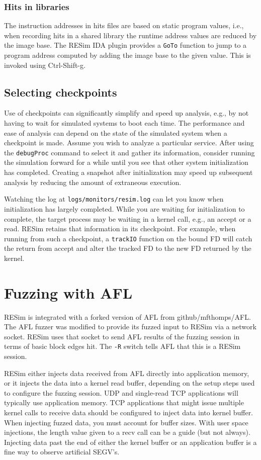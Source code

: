 \documentclass[titlepage]{article}
\begin{document}
\subsubsection{Hits in libraries}
The instruction addresses in hits files are based on static program values, i.e., when recording hits in a shared library the runtime address values are reduced by the image base. 
The RESim IDA plugin provides a {\tt GoTo} function to jump to a program address computed by adding the image base to the given value.  This is invoked using Ctrl-Shift-g.

\subsection{Selecting checkpoints}
Use of checkpoints can significantly simplify and speed up analysis, e.g., by not having to wait for simulated systems to boot each time.
The performance and ease of analysis can depend on the state of the simulated system when a checkpoint is made.  Assume you wish to analyze 
a particular service. After using the {\tt debugProc} command to select it and gather its information, consider running the simulation
forward for a while until you see that other system initialization has completed.  Creating a snapshot after initialization may speed up
subsequent analysis by reducing the amount of extraneous execution.  

Watching the log at {\tt logs/monitors/resim.log} can let you know when initialization has largely completed.
While you are waiting for initialization to complete, the target process may be waiting in a kernel call, e.g., an accept or a read.
RESim retains that information in its checkpoint.  For example, when running from such a checkpoint, a {\tt trackIO} function on the bound FD 
will catch the return from accept and alter the tracked FD to the new FD returned by the kernel.

\section{Fuzzing with AFL}
\label{fuzz}
RESim is integrated with a forked version of AFL from github/mfthomps/AFL.
The AFL fuzzer was modified to provide its fuzzed input to RESim via a
network socket.  RESim uses that socket to send AFL results of the fuzzing
session in terms of basic block edges hit.  The {\tt -R} switch tells AFL
that this is a RESim session.

RESim either injects data received from AFL directly into application memory, or it injects the data into
a kernel read buffer, depending on the setup steps used to configure the fuzzing session.  UDP and single-read TCP applications
will typically use application memory.  TCP applications that might issue multiple kernel calls to receive
data should be configured to inject data into kernel buffer.  When injecting fuzzed data, you must account for buffer sizes.  With user space injections, the length value
given to a recv call can be a guide (but not always).  Injecting data past the end of either the kernel buffer or an application buffer is a fine
way to observe artificial SEGV's.
\end{document}
